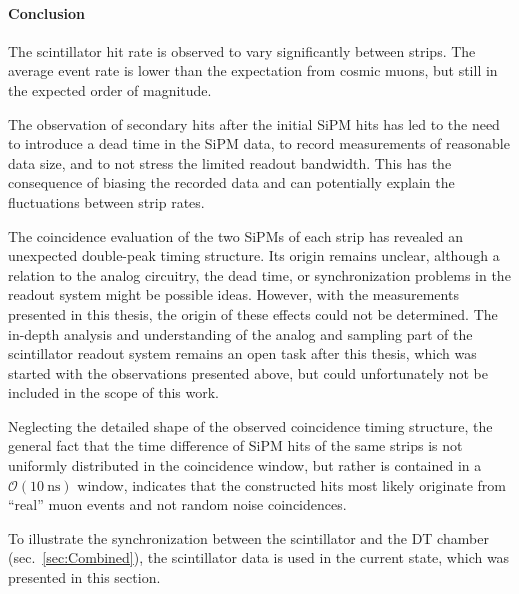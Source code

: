 \paragraph{Conclusion}
The scintillator hit rate is observed to vary significantly between strips. The average event rate is lower than the expectation from cosmic muons, but still in the expected order of magnitude. 
\par The observation of secondary hits after the initial \ac{SiPM} hits has led to the need to introduce a dead time in the \ac{SiPM} data, to record measurements of reasonable data size, and to not stress the limited readout bandwidth. This has the consequence of biasing the recorded data and can potentially explain the fluctuations between strip rates.
\par The coincidence evaluation of the two \acp{SiPM} of each strip has revealed an unexpected double-peak timing structure. Its origin remains unclear, although a relation to the analog circuitry, the dead time, or synchronization problems in the readout system might be possible ideas. However, with the measurements presented in this thesis, the origin of these effects could not be determined. The in-depth analysis and understanding of the analog and sampling part of the scintillator readout system remains an open task after this thesis, which was started with the observations presented above, but could unfortunately not be included in the scope of this work. 
\par Neglecting the detailed shape of the observed coincidence timing structure, the general fact that the time difference of \ac{SiPM} hits of the same strips is not uniformly distributed in the coincidence window, but rather is contained in a $\mathcal{O}(\SI{10}{\nano\second})$ window, indicates that the constructed hits most likely originate from \enquote{real} muon events and not random noise coincidences.
\par To illustrate the synchronization between the scintillator and the \ac{DT} chamber (sec.\ \ref{sec:Combined}), the scintillator data is used in the current state, which was presented in this section.